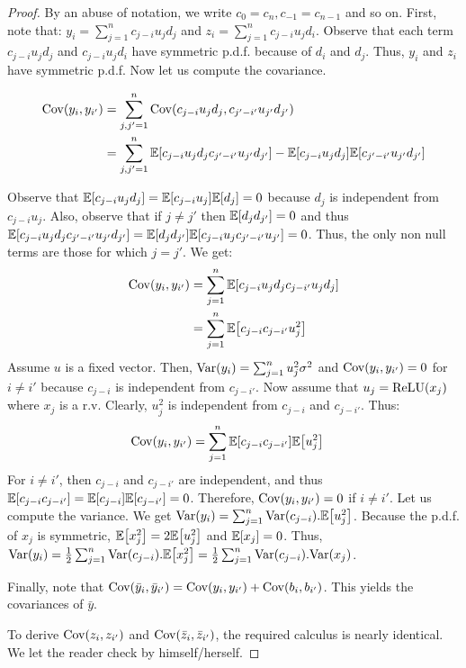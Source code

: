 \begin{proof}

By an abuse of notation, we write $c_{0}=c_{n},c_{-1}=c_{n-1}$ and so on.
First, note that: $y_{i}=\sum_{j=1}^{n}c_{j-i}u_{j}d_{j}$ and $z_{i}=\sum_{j=1}^{n}c_{j-i}u_{j}d_{i}$.
Observe that each term $c_{j-i}u_{j}d_{j}$ and $c_{j-i}u_{j}d_{i}$ have symmetric p.d.f. because of $d_{i}$ and $d_{j}$.
Thus, $y_{i}$ and $z_{i}$ have symmetric p.d.f. Now let us compute the covariance.

\begin{align}
    \Cov(y_{i},y_{i'}) &= \sum_{j,j'=1}^{n} \Cov\left(c_{j-i}u_{j}d_{j},c_{j'-i'}u_{j'}d_{j'}\right) \\
        &= \sum_{j,j'=1}^{n}\Ebb\left[c_{j-i}u_{j}d_{j}c_{j'-i'}u_{j'}d_{j'}\right] - \Ebb\left[c_{j-i}u_{j}d_{j}\right] \Ebb\left[ c_{j'-i'}u_{j'}d_{j'} \right]
\end{align}

Observe that $\Ebb\left[c_{j-i}u_{j}d_{j}\right]=\Ebb\left[c_{j-i}u_{j}\right]\Ebb\left[d_{j}\right]=0$ because $d_{j}$ is independent from $c_{j-i}u_{j}$.
Also, observe that if $j\neq j'$ then $\Ebb\left[d_{j}d_{j'}\right]=0$ and thus $\Ebb\left[c_{j-i}u_{j}d_{j}c_{j'-i'}u_{j'}d_{j'}\right]=\Ebb\left[d_{j}d_{j'}\right]\Ebb\left[c_{j-i}u_{j}c_{j'-i'}u_{j'}\right]=0$.
Thus, the only non null terms are those for which $j=j'$. We get:
\begin{align*}
  \Cov(y_{i},y_{i'}) & =\sum_{j=1}^{n}\Ebb\left[c_{j-i}u_{j}d_{j}c_{j-i'}u_{j}d_{j}\right] \\
   & =\sum_{j=1}^{n}\Ebb\left[c_{j-i}c_{j-i'}u_{j}^{2}\right]
\end{align*}
Assume $u$ is a fixed vector. Then, $\mathrm{Var}(y_{i})=\sum_{j=1}^{n}u_{j}^{2}\sigma^{2}$ and $\mathrm{Cov}(y_{i},y_{i'})=0$ for $i\neq i'$ because $c_{j-i}$ is independent from $c_{j-i'}$.
Now assume that $u_{j} = \operatorname{ReLU}(x_{j})$ where $x_{j}$ is a r.v. Clearly, $u_{j}^{2}$ is independent from $c_{j-i}$ and $c_{j-i'}$. Thus:
\begin{align*}
  \Cov(y_{i},y_{i'}) & =\sum_{j=1}^{n}\Ebb \left[ c_{j-i}c_{j-i'}\right] \Ebb\left[ u_{j}^{2} \right]
\end{align*}
For $i\neq i'$, then $c_{j-i}$ and $c_{j-i'}$ are independent, and thus $\Ebb\left[c_{j-i}c_{j-i'}\right]=\Ebb\left[c_{j-i}\right]\Ebb\left[c_{j-i'}\right]=0$.
Therefore, $\mathrm{Cov}(y_{i},y_{i'}) = 0$ if $i \neq i'$.
Let us compute the variance.
We get $\Var(y_{i})=\sum_{j=1}^{n} \Var(c_{j-i}).\Ebb\left[u_{j}^{2}\right]$.
Because the p.d.f. of $x_{j}$ is symmetric, $\Ebb\left[x_{j}^{2}\right]=2\Ebb\left[u_{j}^{2}\right]$ and $\Ebb\left[x_{j}\right]=0$.
Thus, $\Var(y_{i})=\frac{1}{2}\sum_{j=1}^{n} \Var(c_{j-i}).
\Ebb\left[x_{j}^{2}\right]=\frac{1}{2}\sum_{j=1}^{n} \Var(c_{j-i}).\Var(x_{j})$.

Finally, note that $\mathrm{Cov} (\bar{y}_{i},\bar{y}_{i'}) = \mathrm{Cov}( y_{i},y_{i'} ) + \mathrm{Cov}( b_{i},b_{i'} )$. This yields the covariances of $\bar{y}$.

To derive $\mathrm{Cov}(z_{i},z_{i'})$ and $\mathrm{Cov}(\bar{z}_{i},\bar{z}_{i'})$, the required calculus is nearly identical. We let the reader check by himself/herself.
\end{proof}


